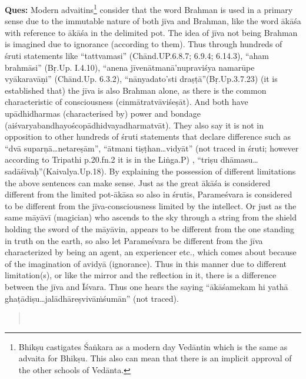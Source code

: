 \textbf{Ques:} Modern advaitins\footnote{Bhikṣu castigates Śaṅkara as a modern day Vedāntin which is the same as advaita for Bhikṣu. This also can mean that there is an implicit approval of the other schools of Vedānta.} consider that the word Brahman is used in a primary sense due to the immutable nature of both jīva and Brahman, like the word ākāśa with reference to ākāśa in the delimited pot. The idea of jīva not being Brahman is imagined due to ignorance (according to them). Thus through hundreds of śruti statements like “tattvamasi” (Chānd.UP.6.8.7; 6.9.4; 6.14.3), “aham brahmāsi” (Bṛ.Up. I.4.10), “anena jīvenātmanā’nupraviśya namarūpe vyākaravāṇi” (Chānd.Up. 6.3.2), “nānyadato’sti draṣṭā”(Bṛ.Up.3.7.23) (it is established that) the jīva is also Brahman alone, as there is the common characteristic of consciousness (cinmātratvāviśeṣāt). And both have upādhidharmas (characterised by) power and bondage (aiśvaryabandhayoścopādhidvayadharmatvāt). They also say it is not in opposition to other hundreds of śruti statements that declare difference such as “dvā suparṇā\-…netareṣām”, “ātmani tiṣṭhan…vidyāt” (not traced in śruti; however according to Tripathi p.20.fn.2 it is in the Liṅga.P) , “triṣu dhāmasu…\-sadāśivaḥ”(Kaivalya.Up.18). By explaining the possession of different limitations the above sentences can make sense. Just as the great ākāśa is considered different from the limited pot-ākāsa so also in śrutis, Parameśvara is considered to be different from the jīva-consciousness limited by the intellect. Or just as the same māyāvī (magician) who ascends to the sky through a string from the shield holding the sword of the māyāvin, appears to be different from the one standing in truth on the earth, so also let Parameśvara be different from the jīva characterized by being an agent, an experiencer etc., which comes about because of the imagination of avidyā (ignorance). Thus in this manner due to   different limitation(s), or like the mirror and the reflection in it, there is a difference between the jīva and Īśvara. Thus one hears the saying “ākāśamekam hi yathā ghaṭādiṣu…jalādhāreṣvivāṁśumān” (not traced). 


\begin{verse}
\\
\end{verse}

